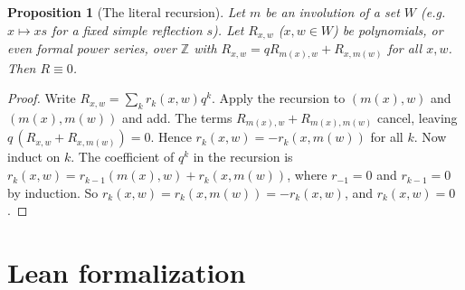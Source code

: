 \documentclass[11pt]{article}
\newtheorem{proposition}[theorem]{Proposition}
\theoremstyle{remark}
\begin{document}
\begin{proposition}[The literal recursion]\label{prop:literal}
Let $m$ be an involution of a set $W$ (e.g.\ $x\mapsto xs$ for a fixed simple
reflection $s$). Let $R_{x,w}$ ($x,w\in W$) be polynomials, or even formal power
series, over $\mathbb Z$ with $R_{x,w}=qR_{m(x),w}+R_{x,m(w)}$ for all $x,w$.
Then $R\equiv0$.
\end{proposition}

\begin{proof}
Write $R_{x,w}=\sum_k r_k(x,w)q^k$. Apply the recursion to $(m(x),w)$ and
$(m(x),m(w))$ and add. The terms $R_{m(x),w}+R_{m(x),m(w)}$ cancel, leaving
$q\,(R_{x,w}+R_{x,m(w)})=0$. Hence $r_k(x,w)=-r_k(x,m(w))$ for all $k$. Now
induct on $k$. The coefficient of $q^k$ in the recursion is
$r_k(x,w)=r_{k-1}(m(x),w)+r_k(x,m(w))$, where $r_{-1}=0$ and $r_{k-1}=0$ by
induction. So $r_k(x,w)=r_k(x,m(w))=-r_k(x,w)$, and $r_k(x,w)=0$.
\end{proof}

\section{Lean formalization}\label{sec:lean}
\end{document}
